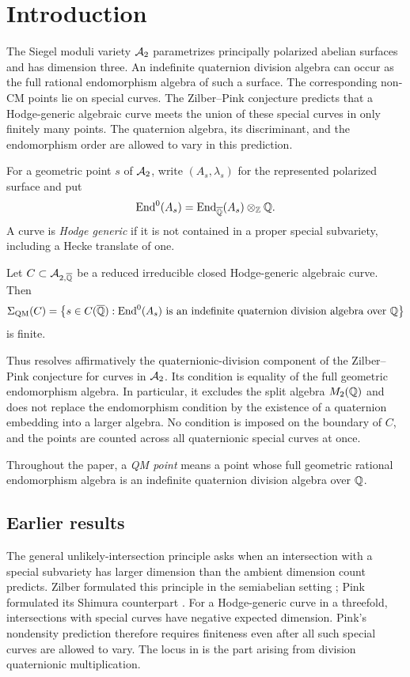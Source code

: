 \section{Introduction}\label{sec:introduction}

The Siegel moduli variety \(\mathcal A_2\) parametrizes principally polarized abelian surfaces and has dimension three. An indefinite quaternion division algebra can occur as the full rational endomorphism algebra of such a surface. The corresponding non-CM points lie on special curves. The Zilber--Pink conjecture predicts that a Hodge-generic algebraic curve meets the union of these special curves in only finitely many points. The quaternion algebra, its discriminant, and the endomorphism order are allowed to vary in this prediction.

For a geometric point \(s\) of \(\mathcal A_2\), write \((A_s,\lambda_s)\) for the represented polarized surface and put
\[
 \operatorname{End}^0(A_s)=\operatorname{End}_{\overline{\mathbb Q}}(A_s)\otimes_{\mathbb Z}\mathbb Q.
\]
A curve is \emph{Hodge generic} if it is not contained in a proper special subvariety, including a Hecke translate of one.

\begin{theorem}\label{thm:main}
Let \(C\subset\mathcal A_{2,\overline{\mathbb Q}}\) be a reduced irreducible closed Hodge-generic algebraic curve. Then
\[
 \Sigma_{\mathrm{QM}}(C)=
 \bigl\{s\in C(\overline{\mathbb Q}):
   \operatorname{End}^0(A_s)\text{ is an indefinite quaternion division algebra over }\mathbb Q
 \bigr\}
\]
is finite.
\end{theorem}

Thus  resolves affirmatively the quaternionic-division component of the Zilber--Pink conjecture for curves in \(\mathcal A_2\). Its condition is equality of the full geometric endomorphism algebra. In particular, it excludes the split algebra \(M_2(\mathbb Q)\) and does not replace the endomorphism condition by the existence of a quaternion embedding into a larger algebra. No condition is imposed on the boundary of \(C\), and the points are counted across all quaternionic special curves at once.

Throughout the paper, a \emph{QM point} means a point whose full geometric rational endomorphism algebra is an indefinite quaternion division algebra over \(\mathbb Q\).

\subsection{Earlier results}

The general unlikely-intersection principle asks when an intersection
with a special subvariety has larger dimension than the ambient
dimension count predicts.  Zilber formulated this principle in the
semiabelian setting \cite{Zilber2002}; Pink formulated its Shimura
counterpart \cite[Conjecture~1.3]{Pink2005}.  For a Hodge-generic curve
in a threefold, intersections with special curves have negative
expected dimension.  Pink's nondensity prediction therefore requires
finiteness even after all such special curves are allowed to vary.
The locus in  is the part arising from division
quaternionic multiplication.

